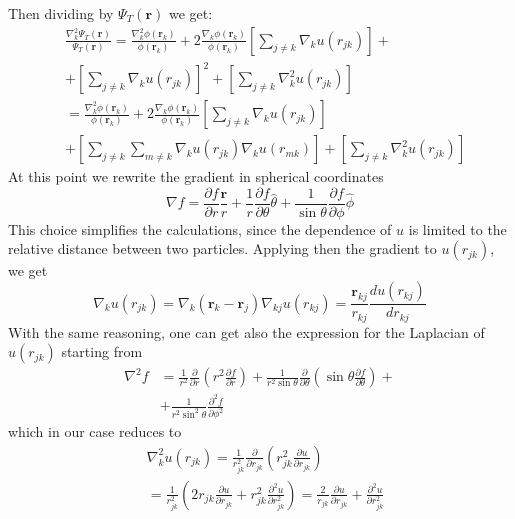 Then dividing by $\Psi_T(\mathbf{r})$ we get: 
\begin{align*}
    &\frac{ \nabla_k^2 \Psi_T(\mathbf{r})}{\Psi_T(\mathbf{r})} = \frac{\nabla_k^2 \phi(\mathbf{r}_k)}{\phi(\mathbf{r}_k)} + 2 \frac{\nabla_k \phi(\mathbf{r}_k)}{\phi(\mathbf{r}_k)} \left[ \sum_{j\neq k} \nabla_k u(r_{jk}) \right] + \\
    & +\left[ \sum_{j\neq k} \nabla_k u(r_{jk}) \right]^2 + \left[ \sum_{j\neq k} \nabla_k^2 u(r_{jk}) \right] \\
    &= \frac{\nabla_k^2 \phi(\mathbf{r}_k)}{\phi(\mathbf{r}_k)} + 2 \frac{\nabla_k \phi(\mathbf{r}_k)}{\phi(\mathbf{r}_k)} \left[ \sum_{j\neq k} \nabla_k u(r_{jk}) \right] \nonumber\\
    & + \left[ \sum_{j\neq k} \sum_{m \neq k} \nabla_k u(r_{jk}) \nabla_k u(r_{mk}) \right] + \left[ \sum_{j\neq k} \nabla_k^2 u(r_{jk}) \right] 
\end{align*}
At this point we rewrite the gradient in spherical coordinates
\begin{equation*}
    \nabla f = \frac{\partial f}{\partial r} \frac{\mathbf{r}}{r} + \frac{1}{r} \frac{\partial f}{\partial \theta} \hat{\theta} + \frac{1}{\sin \theta} \frac{\partial f}{\partial \phi} \hat{\phi}
\end{equation*}
This choice simplifies the calculations, since the dependence of $u$ is limited to the relative distance between two particles. Applying then the gradient to $u(r_{jk})$, we get
\begin{equation*}
    \nabla_k u(r_{jk}) = \nabla_k (\mathbf{r}_k - \mathbf{r}_j) \nabla_{kj} u(r_{kj}) = \frac{\mathbf{r}_{kj}}{r_{kj}} \frac{du(r_{kj})}{dr_{kj}}
\end{equation*}
With the same reasoning, one can get also the expression for the Laplacian of $u(r_{jk})$ starting from
\begin{align*}
    \nabla^2 f &= \frac{1}{r^2} \frac{\partial}{\partial r} \left( r^2 \frac{\partial f}{\partial r} \right) + \frac{1}{r^2 \sin\theta } \frac{\partial }{\partial\theta} \left( \sin \theta \frac{\partial f}{\partial \theta} \right) + \\ 
    &+\frac{1}{r^2 \sin^2 \theta} \frac{\partial^2 f}{\partial \phi^2}
\end{align*}
which in our case reduces to
\begin{align*}
    &\nabla_k^2 u(r_{jk}) = \frac{1}{r_{jk}^2} \frac{\partial}{\partial r_{jk}} \left( r_{jk}^2 \frac{\partial u}{\partial r_{jk}} \right) \\ &= \frac{1}{r_{jk}^2}  \left( 2 r_{jk} \frac{\partial u}{\partial r_{jk}} + r_{jk}^2 \frac{\partial^2 u}{\partial r_{jk}^2} \right) = \frac{2}{r_{jk}} \frac{\partial u}{\partial r_{jk}} + \frac{\partial^2 u}{\partial r_{jk}^2}
\end{align*}
